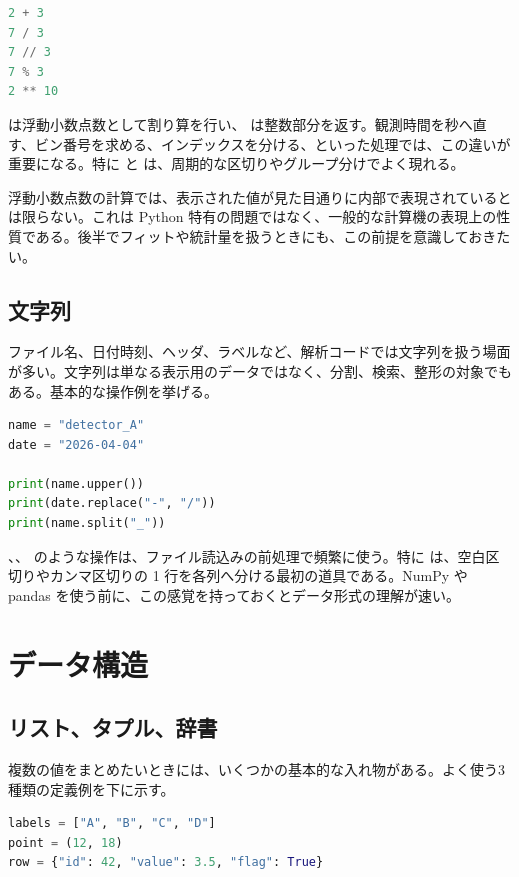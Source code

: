 \begin{lstlisting}[language=Python]
2 + 3
7 / 3
7 // 3
7 % 3
2 ** 10
\end{lstlisting}

\code{/} は浮動小数点数として割り算を行い、\code{//} は整数部分を返す。観測時間を秒へ直す、ビン番号を求める、インデックスを分ける、といった処理では、この違いが重要になる。特に \code{//} と \code{\%} は、周期的な区切りやグループ分けでよく現れる。

浮動小数点数の計算では、表示された値が見た目通りに内部で表現されているとは限らない。これは Python 特有の問題ではなく、一般的な計算機の表現上の性質である。後半でフィットや統計量を扱うときにも、この前提を意識しておきたい。

\subsection{文字列}

ファイル名、日付時刻、ヘッダ、ラベルなど、解析コードでは文字列を扱う場面が多い。文字列は単なる表示用のデータではなく、分割、検索、整形の対象でもある。基本的な操作例を挙げる。

\begin{lstlisting}[language=Python]
name = "detector_A"
date = "2026-04-04"

print(name.upper())
print(date.replace("-", "/"))
print(name.split("_"))
\end{lstlisting}

、、 のような操作は、ファイル読込みの前処理で頻繁に使う。特に  は、空白区切りやカンマ区切りの 1 行を各列へ分ける最初の道具である。NumPy や pandas を使う前に、この感覚を持っておくとデータ形式の理解が速い。

\section{データ構造}

\subsection{リスト、タプル、辞書}

複数の値をまとめたいときには、いくつかの基本的な入れ物がある。よく使う3種類の定義例を下に示す。

\begin{lstlisting}[language=Python]
labels = ["A", "B", "C", "D"]
point = (12, 18)
row = {"id": 42, "value": 3.5, "flag": True}
\end{lstlisting}

